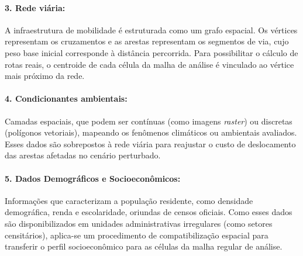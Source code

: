 \paragraph{3. Rede viária:} A infraestrutura de mobilidade é estruturada como um grafo espacial. Os vértices representam os cruzamentos e as arestas representam os segmentos de via, cujo peso base inicial corresponde à distância percorrida. Para possibilitar o cálculo de rotas reais, o centroide de cada célula da malha de análise é vinculado ao vértice mais próximo da rede.

\paragraph{4. Condicionantes ambientais:} Camadas espaciais, que podem ser contínuas (como imagens \textit{raster}) ou discretas (polígonos vetoriais), mapeando os fenômenos climáticos ou ambientais avaliados. Esses dados são sobrepostos à rede viária para reajustar o custo de deslocamento das arestas afetadas no cenário perturbado.

\paragraph{5. Dados Demográficos e Socioeconômicos:} Informações que caracterizam a população residente, como densidade demográfica, renda e escolaridade, oriundas de censos oficiais. Como esses dados são disponibilizados em unidades administrativas irregulares (como setores censitários), aplica-se um procedimento de compatibilização espacial para transferir o perfil socioeconômico para as células da malha regular de análise.
